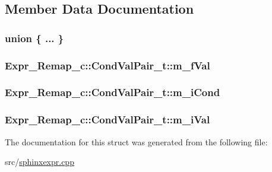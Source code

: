 \subsection{Member Data Documentation}
\hypertarget{structExpr__Remap__c_1_1CondValPair__t_aafaa0e73b8d6c34bbd4880510a9f9f61}{\subsubsection[{"@29}]{\setlength{\rightskip}{0pt plus 5cm}union \{ ... \} }}\label{structExpr__Remap__c_1_1CondValPair__t_aafaa0e73b8d6c34bbd4880510a9f9f61}
\hypertarget{structExpr__Remap__c_1_1CondValPair__t_ac431ac6becb20459de8306a584490031}{
\subsubsection[{m\-\_\-f\-Val}]{ Expr\-\_\-\-Remap\-\_\-c\-::\-Cond\-Val\-Pair\-\_\-t\-::m\-\_\-f\-Val}}\label{structExpr__Remap__c_1_1CondValPair__t_ac431ac6becb20459de8306a584490031}
\hypertarget{structExpr__Remap__c_1_1CondValPair__t_a6d4c8daff74b600832542b0f973821a6}{
\subsubsection[{m\-\_\-i\-Cond}]{ Expr\-\_\-\-Remap\-\_\-c\-::\-Cond\-Val\-Pair\-\_\-t\-::m\-\_\-i\-Cond}}\label{structExpr__Remap__c_1_1CondValPair__t_a6d4c8daff74b600832542b0f973821a6}
\hypertarget{structExpr__Remap__c_1_1CondValPair__t_a6f82fb3184aea275c2f83ba09a906117}{
\subsubsection[{m\-\_\-i\-Val}]{ Expr\-\_\-\-Remap\-\_\-c\-::\-Cond\-Val\-Pair\-\_\-t\-::m\-\_\-i\-Val}}\label{structExpr__Remap__c_1_1CondValPair__t_a6f82fb3184aea275c2f83ba09a906117}


The documentation for this struct was generated from the following file\-:\begin{DoxyCompactItemize}
\item 
src/\hyperlink{sphinxexpr_8cpp}{sphinxexpr.\-cpp}\end{DoxyCompactItemize}
